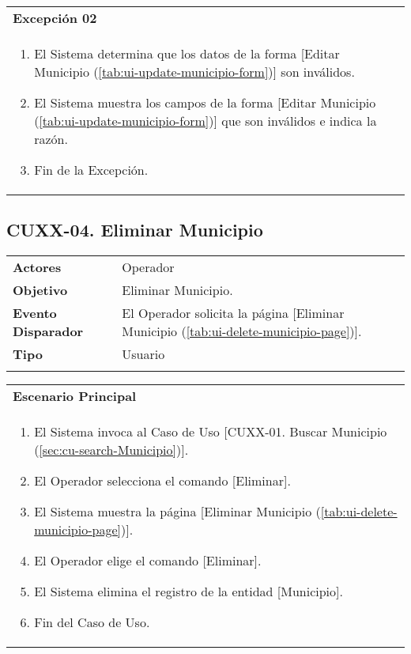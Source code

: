 \begin{tabular}{ p{15.5cm} }
	\textbf{Excepción 02} \\
	\begin{enumerate}
		\item El Sistema determina que los datos de la forma [Editar Municipio (\ref{tab:ui-update-municipio-form})] son inválidos.
		\item El Sistema muestra los campos de la forma [Editar Municipio (\ref{tab:ui-update-municipio-form})] que son inválidos e indica la razón.
		\item Fin de la Excepción.
	\end{enumerate}
\end{tabular}


\clearpage
\subsection{CUXX-04. Eliminar Municipio} \label{sec:cu-delete-Municipio}

\begin{tabular}{ p{3.5cm} p{11.5cm} }
	\textbf{Actores} & Operador\\
	\textbf{Objetivo} & Eliminar Municipio.\\
	\textbf{Evento Disparador} & El Operador solicita la página [Eliminar Municipio (\ref{tab:ui-delete-municipio-page})].\\
	\textbf{Tipo} & Usuario\\
	\\
\end{tabular}

\begin{tabular}{ p{15.5cm} }
	\textbf{Escenario Principal} \\
	\begin{enumerate}
		\item El Sistema invoca al Caso de Uso [CUXX-01. Buscar Municipio (\ref{sec:cu-search-Municipio})].
		\item El Operador selecciona el comando [Eliminar].
		\item El Sistema muestra la página [Eliminar Municipio (\ref{tab:ui-delete-municipio-page})].
		\item El Operador elige el comando [Eliminar].
		\item El Sistema elimina el registro de la entidad [Municipio].
		\item Fin del Caso de Uso.
	\end{enumerate}
\end{tabular}

